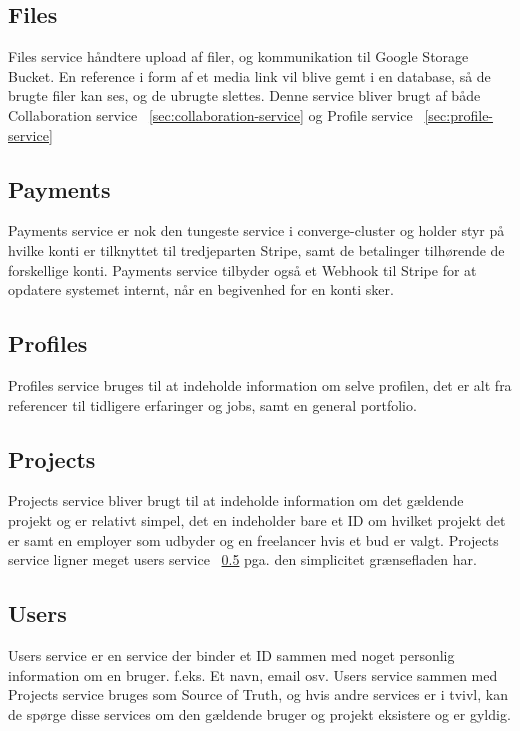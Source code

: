 \subsection{Files}
\label{sec:files-service}

Files service håndtere upload af filer, og kommunikation til Google Storage Bucket. En reference i form af et media link vil blive gemt i en database, så de brugte filer kan ses, og de ubrugte slettes. Denne service bliver brugt af både Collaboration service ~\ref{sec:collaboration-service} og Profile service ~\ref{sec:profile-service}

\subsection{Payments}
\label{sec:payments-service}

Payments service er nok den tungeste service i converge-cluster og holder styr på hvilke konti er tilknyttet til tredjeparten Stripe, samt de betalinger tilhørende de forskellige konti. Payments service tilbyder også et Webhook til Stripe for at opdatere systemet internt, når en begivenhed for en konti sker.

\subsection{Profiles}
\label{sec:profiles-service}

Profiles service bruges til at indeholde information om selve profilen, det er alt fra referencer til tidligere erfaringer og jobs, samt en general portfolio.

\subsection{Projects}
\label{sec:projects-service}

Projects service bliver brugt til at indeholde information om det gældende projekt og er relativt simpel, det en indeholder bare et ID om hvilket projekt det er samt en employer som udbyder og en freelancer hvis et bud er valgt. Projects service ligner meget users service ~\ref{sec:users-service} pga. den simplicitet grænsefladen har.

\subsection{Users}
\label{sec:users-service}

Users service er en service der binder et ID sammen med noget personlig information om en bruger. f.eks. Et navn, email osv. Users service sammen med Projects service bruges som Source of Truth, og hvis andre services er i tvivl, kan de spørge disse services om den gældende bruger og projekt eksistere og er gyldig.

